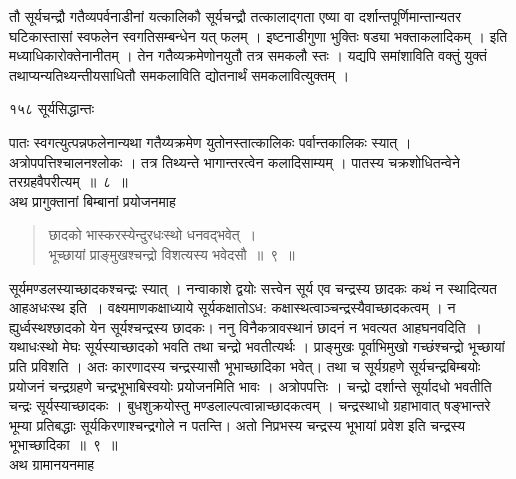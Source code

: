 \documentclass[11pt, openany]{book}
\begin{document}
\begin{sloppypar}
 तौ सूर्यचन्द्रौ गतैव्यपर्वनाडीनां यत्कालिकौ सूर्यचन्द्रौ तत्कालाद्गता एष्या वा दर्शान्तपूर्णिमान्तान्यतर घटिकास्तासां स्वफलेन स्वगतिसम्बन्धेन यत् फलम् । इष्टनाडीगुणा भुक्तिः षड्या भक्ताकलादिकम् । इति मध्याधिकारोक्तेनानीतम् । तेन गतैव्यक्रमेणोनयुतौ तत्र समकलौ स्तः । यद्यपि समांशाविति वक्तुं युक्तं तथाप्यन्यतिथ्यन्तीयसाधितौ समकलाविति द्योतनार्थं समकलावित्युक्तम् ।
\end{sloppypar}

\newpage

\noindent १५८ \hspace{4cm} सूर्यसिद्धान्तः
\vspace{1cm}

\begin{sloppypar}
\noindent पातः स्वगत्युत्पन्नफलेनान्यथा गतैय्यक्रमेण युतोनस्तात्कालिकः पर्वान्तकालिकः स्यात् । अत्रोपपत्तिश्चालनश्लोकः । तत्र तिथ्यन्ते भागान्तरत्वेन कलादिसाम्यम् । पातस्य चक्रशोधितन्वेने तरग्रहवैपरीत्यम्~॥~८~॥\\
\noindent अथ प्रागुक्तानां बिम्बानां प्रयोजनमाह\textendash
\end{sloppypar}


\begin{quote}
  {\ssi छादको भास्करस्येन्दुरधःस्थो धनवद्भवेत्~।\\
भूच्छायां प्राङ्मुखश्चन्द्रो विशत्यस्य भवेदसौ~॥~९~॥}
\end{quote}

\begin{sloppypar}
 सूर्यमण्डलस्याच्छादकश्चन्द्रः स्यात् । नन्वाकाशे द्वयोः सत्त्वेन सूर्य एव चन्द्रस्य छादकः कथं न स्थादित्यत आह\textendash अधःस्थ इति~। वक्ष्यमाणकक्षाध्याये सूर्यकक्षातोऽध: कक्षास्थत्वाञ्चन्द्रस्यैवाच्छादकत्वम् । न ह्युर्ध्वस्थश्छादको येन सूर्यश्चन्द्रस्य छादकः। ननु विनैकत्रावस्थानं छादनं न भवत्यत आह\textendash घनवदिति~। यथाधःस्थो मेघः सूर्यस्याच्छादको भवति तथा चन्द्रो भवतीत्यर्थः । प्राङ्मुखः पूर्वाभिमुखो गच्छंश्चन्द्रो भूच्छायां प्रति प्रविशति । अतः कारणादस्य चन्द्रस्यासौ भूभाच्छादिका भवेत्। तथा च सूर्यग्रहणे सूर्यचन्द्रबिम्बयोः प्रयोजनं चन्द्रग्रहणे चन्द्रभूभाबिस्वयोः प्रयोजनमिति भावः । अत्रोपपत्तिः । चन्द्रो दर्शान्ते सूर्यादधो भवतीति चन्द्रः सूर्यस्याच्छादकः । बुधशुक्रयोस्तु मण्डलाल्पत्वान्नाच्छादकत्वम् । चन्द्रस्थाधो ग्रहाभावात् षङ्भान्तरे भूम्या प्रतिबद्धाः सूर्यकिरणाश्चन्द्रगोले न पतन्ति। अतो निप्रभस्य चन्द्रस्य भूभायां प्रवेश इति चन्द्रस्य भूभाच्छादिका~॥~९~॥\\
 \noindent अथ ग्रामानयनमाह\textendash
\end{sloppypar}
\end{document}

